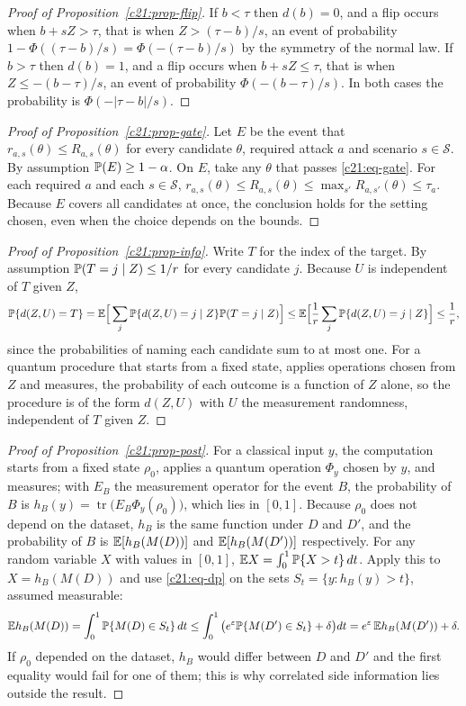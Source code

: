 \begin{proof}[Proof of Proposition~\ref{c21:prop-flip}]
If $b<\tau$ then $d(b)=0$, and a flip occurs when $b+sZ>\tau$, that is when $Z>(\tau-b)/s$, an event of
probability $1-\Phi((\tau-b)/s)=\Phi(-(\tau-b)/s)$ by the symmetry of the normal law. If $b>\tau$ then
$d(b)=1$, and a flip occurs when $b+sZ\le\tau$, that is when $Z\le-(b-\tau)/s$, an event of probability
$\Phi(-(b-\tau)/s)$. In both cases the probability is $\Phi(-|\tau-b|/s)$.
\end{proof}

\begin{proof}[Proof of Proposition~\ref{c21:prop-gate}]
Let $E$ be the event that $r_{a,s}(\theta)\le R_{a,s}(\theta)$ for every candidate $\theta$, required attack $a$ and
scenario $s\in\mathcal S$. By assumption $\mathbb{P}(E)\ge1-\alpha$. On $E$, take any $\theta$ that passes \eqref{c21:eq-gate}. For each
required $a$ and each $s\in\mathcal S$, $r_{a,s}(\theta)\le R_{a,s}(\theta)\le\max_{s'}R_{a,s'}(\theta)\le\tau_a$. Because $E$ covers all
candidates at once, the conclusion holds for the setting chosen, even when the choice depends on the bounds.
\end{proof}

\begin{proof}[Proof of Proposition~\ref{c21:prop-info}]
Write $T$ for the index of the target. By assumption $\mathbb{P}(T=j\mid Z)\le1/r$ for every candidate $j$.
Because $U$ is independent of $T$ given $Z$,
\[\mathbb{P}\{d(Z,U)=T\}=\mathbb{E}\Big[\sum_j\mathbb{P}\{d(Z,U)=j\mid Z\}\mathbb{P}(T=j\mid Z)\Big]\le\mathbb{E}\Big[\frac1r\sum_j\mathbb{P}\{d(Z,U)=j\mid Z\}\Big]\le\frac1r,\]
since the probabilities of naming each candidate sum to at most one. For a quantum procedure that
starts from a fixed state, applies operations chosen from $Z$ and measures, the probability of each
outcome is a function of $Z$ alone, so the procedure is of the form $d(Z,U)$ with $U$ the measurement
randomness, independent of $T$ given $Z$.
\end{proof}

\begin{proof}[Proof of Proposition~\ref{c21:prop-post}]
For a classical input $y$, the computation starts from a fixed state $\rho_0$, applies a quantum
operation $\Phi_y$ chosen by $y$, and measures; with $E_B$ the measurement operator for the event $B$, the
probability of $B$ is $h_B(y)=\operatorname{tr}\big(E_B\Phi_y(\rho_0)\big)$, which lies in $[0,1]$. Because $\rho_0$ does not depend on the
dataset, $h_B$ is the same function under $D$ and $D'$, and the probability of $B$ is $\mathbb{E}[h_B(M(D))]$ and
$\mathbb{E}[h_B(M(D'))]$ respectively. For any random variable $X$ with values in $[0,1]$, $\mathbb{E} X=\int_0^1\mathbb{P}\{X>t\}\,dt$.
Apply this to $X=h_B(M(D))$ and use \eqref{c21:eq-dp} on the sets $S_t=\{y:h_B(y)>t\}$, assumed measurable:
\[\mathbb{E} h_B(M(D))=\int_0^1\mathbb{P}\{M(D)\in S_t\}\,dt\le\int_0^1\big(e^{\varepsilon}\mathbb{P}\{M(D')\in S_t\}+\delta\big)dt=e^{\varepsilon}\,\mathbb{E} h_B(M(D'))+\delta.\]
If $\rho_0$ depended on the dataset, $h_B$ would differ between $D$ and $D'$ and the first equality would fail
for one of them; this is why correlated side information lies outside the result.
\end{proof}

